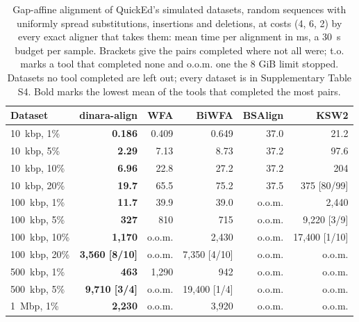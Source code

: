 \begin{table}[t]
\caption{Gap-affine alignment of QuickEd's simulated datasets, random sequences with uniformly spread substitutions, insertions and deletions, at costs (4, 6, 2) by every exact aligner that takes them: mean time per alignment in ms, a 30~s budget per sample. Brackets give the pairs completed where not all were; t.o. marks a tool that completed none and o.o.m. one the 8 GiB limit stopped. Datasets no tool completed are left out; every dataset is in Supplementary Table S4. Bold marks the lowest mean of the tools that completed the most pairs.}\label{tab:affine_sim}
\centering\footnotesize
\setlength{\tabcolsep}{4pt}
\begin{tabular}{@{}lrrrrr@{}}
\toprule
Dataset & dinara-align & WFA & BiWFA & BSAlign & KSW2 \\
\midrule
10~kbp, 1\% & \textbf{0.186} & 0.409 & 0.649 & 37.0 & 21.2 \\
10~kbp, 5\% & \textbf{2.29} & 7.13 & 8.73 & 37.2 & 97.6 \\
10~kbp, 10\% & \textbf{6.96} & 22.8 & 27.2 & 37.2 & 204 \\
10~kbp, 20\% & \textbf{19.7} & 65.5 & 75.2 & 37.5 & 375 [80/99] \\
100~kbp, 1\% & \textbf{11.7} & 39.9 & 39.0 & o.o.m. & 2{,}440 \\
100~kbp, 5\% & \textbf{327} & 810 & 715 & o.o.m. & 9{,}220 [3/9] \\
100~kbp, 10\% & \textbf{1{,}170} & o.o.m. & 2{,}430 & o.o.m. & 17{,}400 [1/10] \\
100~kbp, 20\% & \textbf{3{,}560 [8/10]} & o.o.m. & 7{,}350 [4/10] & o.o.m. & o.o.m. \\
500~kbp, 1\% & \textbf{463} & 1{,}290 & 942 & o.o.m. & o.o.m. \\
500~kbp, 5\% & \textbf{9{,}710 [3/4]} & o.o.m. & 19{,}400 [1/4] & o.o.m. & o.o.m. \\
1~Mbp, 1\% & \textbf{2{,}230} & o.o.m. & 3{,}920 & o.o.m. & o.o.m. \\
\bottomrule
\end{tabular}
\end{table}
